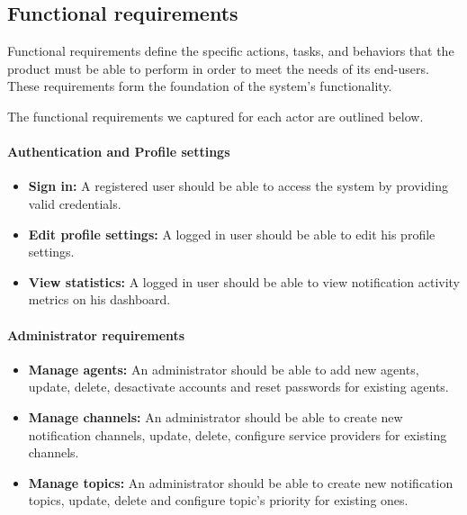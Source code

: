 \subsection{Functional requirements}
\label{freq}
Functional requirements define the specific actions, tasks, and behaviors that the product
must be able to perform in order to meet the needs of its end-users. These requirements
form the foundation of the system's functionality.

\noindent The functional requirements we captured for each actor are outlined below.

\paragraph*{Authentication and Profile settings}
\label{common-req}
\begin{itemize}
      \item \textbf{Sign in:} A registered user should be able to access the system by providing
            valid credentials.
      \item \textbf{Edit profile settings:} A logged in user should be able to edit his profile settings.
      \item \textbf{View statistics:} A logged in user should be able to view notification activity metrics
            on his dashboard.
\end{itemize}
\raggedbottom


\paragraph*{Administrator requirements}
\label{admin-req}
\begin{itemize}
      \item \textbf{Manage agents:} An administrator should be able to add new agents, update,
            delete, desactivate accounts and reset passwords for existing agents.
      \item \textbf{Manage channels:} An administrator should be able to create new notification channels,
            update, delete, configure service providers for existing channels.
      \item \textbf{Manage topics:} An administrator should be able to create new notification topics,
            update, delete and configure topic's priority for existing ones.
\end{itemize}


